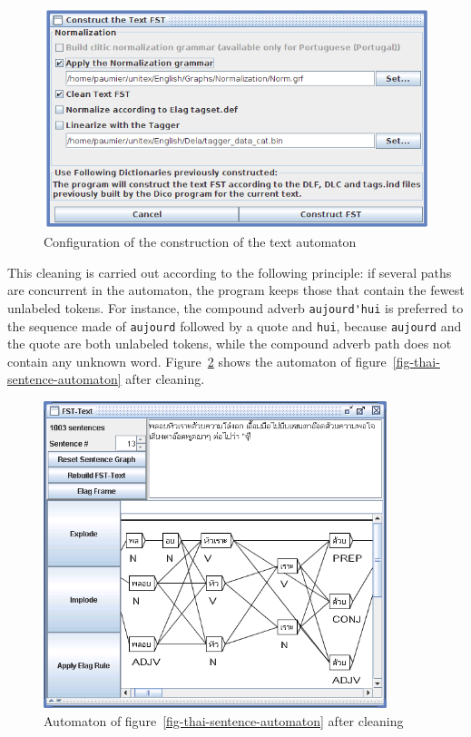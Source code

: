 \begin{figure}[!ht]
\begin{center}
\includegraphics[width=14cm]{resources/img/fig7-10.png}
\caption{Configuration of the construction of the text automaton
\label{fig-Txt2Tfst-configuration}}
\end{center}
\end{figure}

\bigskip
\noindent This cleaning is carried out according to the following principle: if several
paths are concurrent in the automaton, the program keeps those that contain the
fewest unlabeled tokens. For instance, the compound adverb \verb+aujourd'hui+ is
preferred to the sequence made of \verb+aujourd+ followed by a quote and \verb+hui+, because
\verb+aujourd+ and the quote are both unlabeled tokens, while
the compound adverb path does not contain any unknown word.
Figure~\ref{fig-clean-thai-sentence-automaton} shows the automaton of
figure~\ref{fig-thai-sentence-automaton} after cleaning.

\begin{figure}[!ht]
\begin{center}
\includegraphics[width=10cm]{resources/img/fig7-11.png}
\caption{Automaton of
figure~\ref{fig-thai-sentence-automaton} after cleaning\label{fig-clean-thai-sentence-automaton}}
\end{center}
\end{figure}

